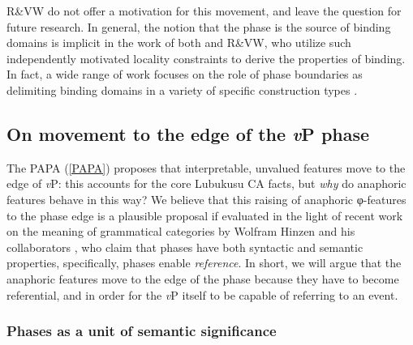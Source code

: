 R\&VW do not offer a motivation for this movement, and leave the question for future research. In general, the notion that the phase is the source of binding domains is implicit in the work of both \citet{Reuland:2011} and R\&VW, who utilize such independently motivated locality constraints to derive the properties of binding. In fact, a wide range of work focuses on the role of phase boundaries as delimiting binding domains in a variety of specific construction types \citep{Wurmbrand:2011,Lee-Schoenfeld:2008,Canac-Marquis:2005,Heinat:2006,Hicks:2009,Quicoli:2008,CharnavelSportiche:2016}.

\subsection{On movement to the edge of the \textit{v}P phase}

The PAPA (\ref{PAPA}) proposes that interpretable, unvalued features move to the edge of \textit{v}P: this accounts for the core Lubukusu CA facts, but \textit{why} do anaphoric features behave in this way? We believe that this raising of anaphoric φ-features to the phase edge is a plausible proposal if evaluated in the light of recent work on the meaning of grammatical categories by Wolfram Hinzen and his collaborators \citep{Hinzen:2012,SheehanHinzen:2011,HinzenSheehan:2013,ArsenijevicHinzen:2012}, who claim that phases have both syntactic and semantic properties, specifically, phases enable \textit{reference}. In short, we will argue that the anaphoric features move to the edge of the phase because they have to become referential, and in order for the \textit{v}P itself to be capable of referring to an event. 

\subsubsection{Phases as a unit of semantic significance}

